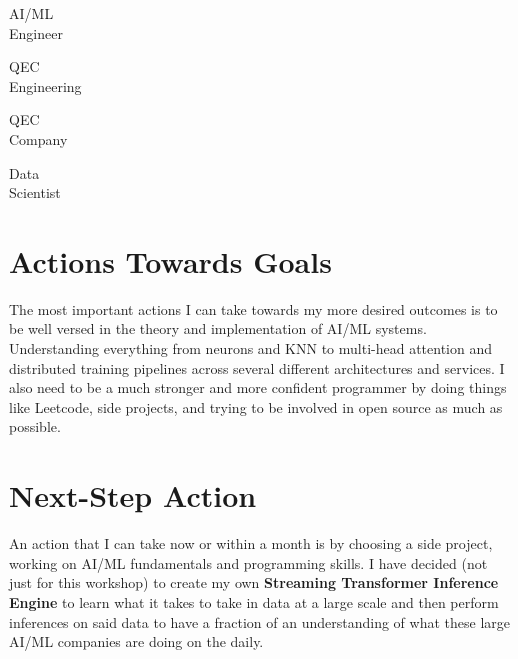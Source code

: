 \documentclass[12pt]{article}
\begin{document}
\begin{tcbraster}[
    raster columns=4,
    raster column skip=0.02\textwidth,
    raster equal height=rows,
    fonttitle=\bfseries\Large,
    boxrule=0.8pt,
    arc=4pt,
    halign title=center,
    halign=center,
]
\begin{tcolorbox}[
    title={\#1},
    colback=goldrank!15,
    colframe=goldrank,
    colbacktitle=goldrank,
    coltitle=white,
]
\centering\small AI/ML\\Engineer
\end{tcolorbox}
\begin{tcolorbox}[
    title={\#2},
    colback=silverrank!15,
    colframe=silverrank,
    colbacktitle=silverrank,
    coltitle=white,
]
\centering\small QEC\\Engineering
\end{tcolorbox}
\begin{tcolorbox}[
    title={\#3},
    colback=bronzerank!15,
    colframe=bronzerank,
    colbacktitle=bronzerank,
    coltitle=white,
]
\centering\small QEC\\Company
\end{tcolorbox}
\begin{tcolorbox}[
    title={\#4},
    colback=ironrank!15,
    colframe=ironrank,
    colbacktitle=ironrank,
    coltitle=white,
]
\centering\small Data\\Scientist
\end{tcolorbox}
\end{tcbraster}

\section{Actions Towards Goals}

The most important actions I can take towards my more desired outcomes is to be well versed in
the theory and implementation of AI/ML systems. Understanding everything from neurons and KNN to
multi-head attention and distributed training pipelines across several different architectures and services.
I also need to be a much stronger and more confident programmer by doing things like Leetcode, side projects,
and trying to be involved in open source as much as possible.

\section{Next-Step Action}

\begin{tcolorbox}[
    title={\ding{43}\ Action Item},
    colback=goldrank!10,
    colframe=goldrank,
    colbacktitle=goldrank,
    coltitle=white,
    fonttitle=\bfseries,
    boxrule=0.8pt,
    arc=4pt,
]
An action that I can take now or within a month is by choosing a side project, working on AI/ML fundamentals
and programming skills. I have decided (not just for this workshop) to create my own \textbf{Streaming
Transformer Inference Engine} to learn what it takes to take in data at a large scale and then perform
inferences on said data to have a fraction of an understanding of what these large AI/ML companies are doing on the daily.
\end{tcolorbox}
\end{document}
